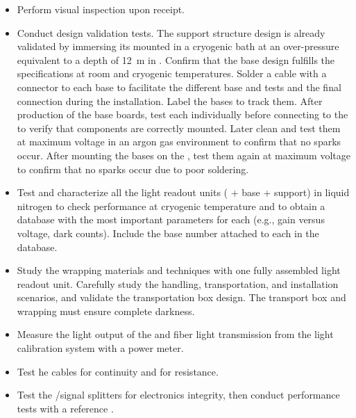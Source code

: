 \begin{itemize}
\item Perform visual inspection upon receipt. %

\item Conduct design validation tests. 
The  support structure design is already validated by immersing its mounted  in a cryogenic bath %
at an over-pressure equivalent to a depth of \SI{12}{m} in . %
Confirm that the  base design fulfills the specifications at room and cryogenic temperatures. 
Solder a cable with a  connector %
to each  base to facilitate the different base and  tests and the final  connection during the installation. 
Label the  bases %
to track them. After production of the  base boards, test each individually %
before connecting to the  to verify that components are correctly mounted. Later clean and test them %
at maximum voltage in an argon gas environment to confirm that no sparks occur. After mounting the bases on the , test them again %
at maximum voltage to confirm that no sparks occur due to poor soldering.

\item Test and characterize all the light readout units ( + base + support) %
 in liquid nitrogen to check performance at cryogenic temperature and to obtain a database with the most important parameters for each  (e.g., gain versus voltage, dark counts). Include the  base number attached to each  %
 in the database.

\item Study the wrapping materials and techniques %
with one fully assembled light readout unit. Carefully study the handling, transportation, and installation scenarios,%
and validate the transportation box design. %
The transport box and  wrapping must ensure complete darkness.

\item Measure the light output of the  and fiber light transmission from the light calibration system %
with a power meter.

\item Test he  cables %
for continuity and for resistance.

\item Test the /signal splitters %
for electronics integrity, then conduct %
performance tests with a reference .

\end{itemize}

